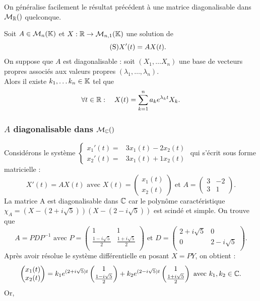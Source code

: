 \documentclass{book}
\begin{document}
On généralise facilement le résultat précédent à une matrice diagonalisable dans $\Mn{\R}$ quelconque.
\begin{Theoreme}
Soit $A\in \mathcal{M}_{n}(\mathbb{K})$ et $X:\mathbb{R}\to\mathcal{M}_{n,1}(\mathbb{K})$ une solution de
\[\tag{$\mathrm{S}$} X'(t) = A X(t).\]
On suppose que $A$ est diagonalisable : soit $(X_1,\dots X_n)$ une base de vecteurs propres associés aux valeurs propres $(\lambda_1,\dots,\lambda_n)$.\\
Alors il existe $k_1,\dots k_n \in \mathbb{K}$ tel que
\[\forall t\in \mathbb{R}   :\quad X(t) = \sum_{k=1}^n a_k e^{\lambda_k t} X_k.\]
\end{Theoreme}
\subsubsection{$A$ diagonalisable dans $\Mn{\C}$}
Considérons le système $\begin{cases}x_1'(t)=&3x_1(t)-2x_2(t)\\x_2'(t)=&3x_1(t)+1x_2(t) \end{cases}$ qui s'écrit sous forme matricielle :
$$X'(t)=AX(t)\text{ avec } X(t)=\begin{pmatrix}x_1(t)\\x_2(t)\end{pmatrix}\text{ et }A=\begin{pmatrix}3&-2\\3&1\end{pmatrix}.$$
La matrice A est diagonalisable dans $\mathbb{C}$ car le polynôme caractéristique $\chi_A=(X-(2+i\sqrt{5}))(X-(2-i\sqrt{5}))$ est scindé et simple. On trouve que 
$$ A=PDP^{-1}\text{ avec } P=\begin{pmatrix}1 & 1\\\frac{1-i\sqrt{5}}{2}& \frac{1+i\sqrt{5}}{2}\\ \end{pmatrix}\text{ et }D=\begin{pmatrix}2+i\sqrt{5} &0\\0&2-i\sqrt{5}\\ \end{pmatrix}.$$
Après avoir résolue le système différentielle en posant $X=PY$, on obtient :
$$\begin{pmatrix}
x_1(t)\\x_2(t)
\end{pmatrix} = k_1e^{(2+i\sqrt{5})t}\begin{pmatrix}
1\\\frac{1-i\sqrt{5}}{2}
\end{pmatrix}+k_2e^{(2-i\sqrt{5})t}\begin{pmatrix}
1\\\frac{1+i\sqrt{5}}{2}
\end{pmatrix}\text{ avec }k_1,k_2\in\mathbb{C}. $$ Or, 
\end{document}
